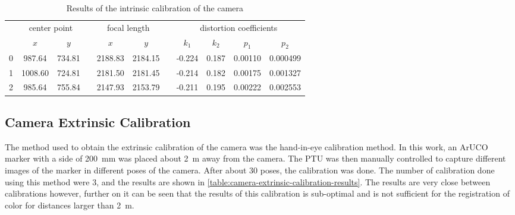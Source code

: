 \begin{table}[h]
    \caption{Results of the intrinsic calibration of the camera}

    \centering
    \begin{tabular}{@{} c cc c cc c cccc @{} }
        \toprule
           & \multicolumn{2}{c}{center point} & & \multicolumn{2}{c}{focal length} & & \multicolumn{4}{c}{distortion coefficients} \\
        \cmidrule{2-3} \cmidrule{5-6} \cmidrule{8-9}

        {} & $x$ & $y$ &  & $x$ & $y$ & & $k_1$ & $k_2$ & $p_1$ & $p_2$  \\
        \midrule
        0 &   987.64 & 734.81 & & 2188.83 & 2184.15 & & -0.224 & 0.187 & 0.00110 & 0.000499  \\
        1 &  1008.60 & 724.81 & & 2181.50 & 2181.45 & & -0.214 & 0.182 & 0.00175 & 0.001327  \\
        2 &   985.64 & 755.84 & & 2147.93 & 2153.79 & & -0.211 & 0.195 & 0.00222 & 0.002553  \\
        \bottomrule
    \end{tabular}

    \label{table:camera-intrinsic-calibration-results}
\end{table}

\subsection{Camera Extrinsic Calibration}

The method used to obtain the extrinsic calibration of the camera was the hand-in-eye calibration method. In this work, an ArUCO marker with a side of \SI{200}{\milli\meter} was placed about \SI{2}{\meter} away from the camera. The PTU was then manually controlled to capture different images of the marker in different poses of the camera. After about 30 poses, the calibration was done. The number of calibration done using this method were 3, and the results are shown in \cref{table:camera-extrinsic-calibration-results}. The results are very close between calibrations however, further on it can be seen that the results of this calibration is sub-optimal and is not sufficient for the registration of color for distances larger than \SI{2}{\meter}.

